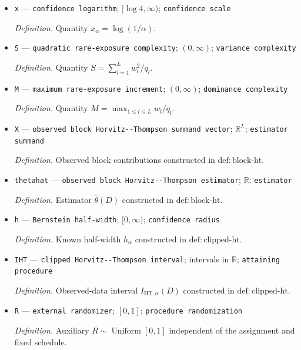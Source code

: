 \documentclass{article}
\begin{document}
\begin{itemize}
  \par\smallskip\noindent\emph{Definition.} \texttt{Target design-\allowbreak{}based miscoverage probability.}
  \item \texttt{x} --- \texttt{confidence logarithm}; \([\log 4,\infty)\); \texttt{confidence scale}
  \par\smallskip\noindent\emph{Definition.} Quantity \(x_\alpha=\log(1/\alpha)\).
  \item \texttt{S} --- \texttt{quadratic rare-\allowbreak{}exposure complexity}; \((0,\infty)\); \texttt{variance complexity}
  \par\smallskip\noindent\emph{Definition.} Quantity \(S=\sum_{l=1}^Lw_l^2/q_l\).
  \item \texttt{M} --- \texttt{maximum rare-\allowbreak{}exposure increment}; \((0,\infty)\); \texttt{dominance complexity}
  \par\smallskip\noindent\emph{Definition.} Quantity \(M=\max_{1\le l\le L}w_l/q_l\).
  \item \texttt{X} --- \texttt{observed block Horvitz-\allowbreak{}-\allowbreak{}Thompson summand vector}; \(\mathbb R^L\); \texttt{estimator summand}
  \par\smallskip\noindent\emph{Definition.} Observed block contributions constructed in \(\mathrm{def{:}block\text{-}ht}\).
  \item \texttt{thetahat} --- \texttt{observed block Horvitz-\allowbreak{}-\allowbreak{}Thompson estimator}; \(\mathbb R\); \texttt{estimator}
  \par\smallskip\noindent\emph{Definition.} Estimator \(\widehat\theta(D)\) constructed in \(\mathrm{def{:}block\text{-}ht}\).
  \item \texttt{h} --- \texttt{Bernstein half-\allowbreak{}width}; \([0,\infty)\); \texttt{confidence radius}
  \par\smallskip\noindent\emph{Definition.} Known half-width \(h_\alpha\) constructed in \(\mathrm{def{:}clipped\text{-}ht}\).
  \item \texttt{IHT} --- \texttt{clipped Horvitz-\allowbreak{}-\allowbreak{}Thompson interval}; intervals in \(\mathbb R\); \texttt{attaining procedure}
  \par\smallskip\noindent\emph{Definition.} Observed-data interval \(I_{\mathrm{HT},\alpha}(D)\) constructed in \(\mathrm{def{:}clipped\text{-}ht}\).
  \item \texttt{R} --- \texttt{external randomizer}; \([0,1]\); \texttt{procedure randomization}
  \par\smallskip\noindent\emph{Definition.} Auxiliary \(R\sim\operatorname{Uniform}[0,1]\) independent of the assignment and fixed schedule.

\end{itemize}
\end{document}
